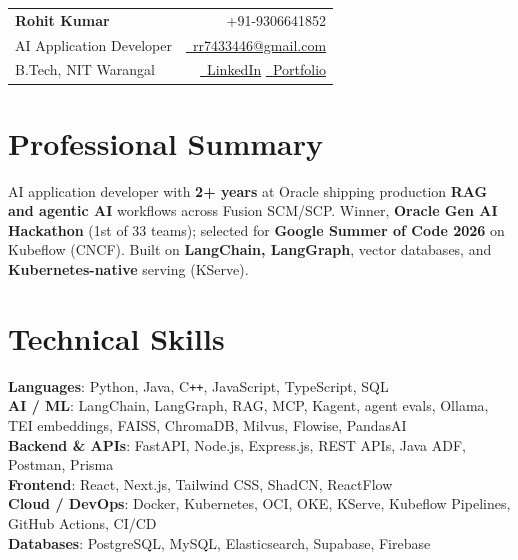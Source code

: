 \documentclass[a4paper,10pt]{article}
\makeatletter
\newcommand{\phone}{9306641852}
\newcommand{\emaila}{rr7433446@gmail.com}
\makeatother
\begin{document}
\selectfont

{
\begin{tabularx}{\linewidth}{L r} \\
  \textbf{\Large Rohit Kumar} & {\raisebox{0.0\height}{\footnotesize \faPhone}\ +91-\phone}\\
  {AI Application Developer} & \href{mailto:\emaila}{\raisebox{0.0\height}{\footnotesize \faEnvelope}\ {\emaila}} \\
  {B.Tech, NIT Warangal} & \href{https://www.linkedin.com/in/rr7433446/}{\raisebox{0.0\height}{\footnotesize \faLinkedin}\ {LinkedIn}}\enspace
  \href{https://kmrrohit.vercel.app/}{\raisebox{0.0\height}{\footnotesize \faGlobe}\ {Portfolio}}
\end{tabularx}
}

\section{\textbf{Professional Summary}}
\begin{itemize}[leftmargin=0.05in, label={}]
  \small{\item{
    AI application developer with \textbf{2+ years} at Oracle shipping production \textbf{RAG and agentic AI} workflows across Fusion SCM/SCP. Winner, \textbf{Oracle Gen AI Hackathon} (1st of 33 teams); selected for \textbf{Google Summer of Code 2026} on Kubeflow (CNCF). Built on \textbf{LangChain, LangGraph}, vector databases, and \textbf{Kubernetes-native} serving (KServe).
  }}
\end{itemize}
\vspace{-8pt}

\section{\textbf{Technical Skills}}
\begin{itemize}[leftmargin=0.05in, label={}]
  \small{\item{
    \textbf{Languages}{: Python, Java, C\texttt{++}, JavaScript, TypeScript, SQL} \\
    \textbf{AI / ML}{: LangChain, LangGraph, RAG, MCP, Kagent, agent evals, Ollama, TEI embeddings, FAISS, ChromaDB, Milvus, Flowise, PandasAI} \\
    \textbf{Backend \& APIs}{: FastAPI, Node.js, Express.js, REST APIs, Java ADF, Postman, Prisma} \\
    \textbf{Frontend}{: React, Next.js, Tailwind CSS, ShadCN, ReactFlow} \\
    \textbf{Cloud / DevOps}{: Docker, Kubernetes, OCI, OKE, KServe, Kubeflow Pipelines, GitHub Actions, CI/CD} \\
    \textbf{Databases}{: PostgreSQL, MySQL, Elasticsearch, Supabase, Firebase}
  }}
\end{itemize}
\vspace{-8pt}
\end{document}
